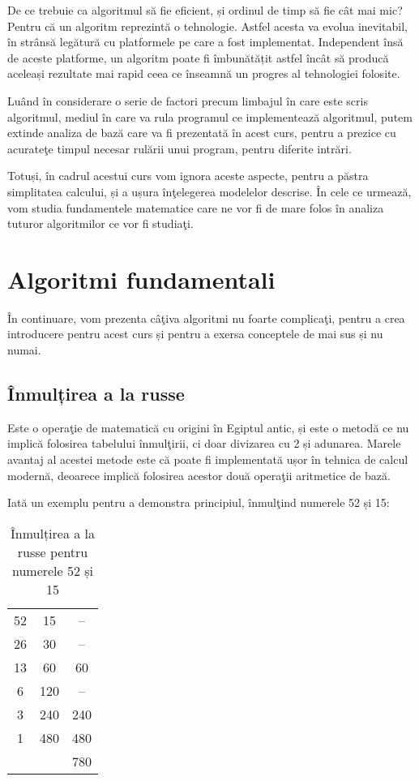 De ce trebuie ca algoritmul să fie eficient, și ordinul de timp să fie cât mai mic? Pentru că un algoritm reprezintă o tehnologie. Astfel acesta va evolua inevitabil, în strânsă legătură cu platformele pe care a fost implementat. Independent însă de aceste platforme, un algoritm poate fi îmbunătățit astfel încât să producă aceleași rezultate mai rapid ceea ce înseamnă un progres al tehnologiei folosite.


Luând în considerare o serie de factori precum limbajul în care este scris algoritmul, mediul în care va rula programul ce implementează algoritmul, putem extinde analiza de bază care va fi prezentată în acest curs, pentru a prezice cu acurateţe timpul necesar rulării unui program, pentru diferite intrări. 

Totuși, în cadrul acestui curs vom ignora aceste aspecte, pentru a păstra simplitatea calcului, și a ușura înţelegerea modelelor descrise. În cele ce urmează, vom studia fundamentele matematice care ne vor fi de mare folos în analiza tuturor algoritmilor ce vor fi studiaţi.

\section{Algoritmi fundamentali}

În continuare, vom prezenta câţiva algoritmi nu foarte complicaţi, pentru a crea
introducere pentru acest curs și pentru a exersa conceptele de mai sus și nu numai.

\subsection{Înmulțirea a la russe}


Este o operaţie de matematică cu origini în Egiptul antic, și este o metodă ce nu implică folosirea tabelului înmulţirii, ci doar divizarea cu 2 și adunarea. Marele avantaj al acestei metode este că poate fi implementată ușor în tehnica de calcul modernă, deoarece implică folosirea acestor două operaţii aritmetice
de bază.

Iată un exemplu pentru a demonstra principiul, înmulţind numerele 52 și 15:

\begin{table}[h]
	\centering
	\begin{tabular}{ c c c }
		52 & 15 & -- \\ 
		26 & 30 & -- \\  
		13 & 60 & 60 \\    
		6 & 120 & -- \\    
		3 & 240 & 240 \\   
		1 & 480 & 480 \\    
		 \hline 
		 &  & 780 \\     
	\end{tabular}
	\caption{Înmulțirea a la russe pentru numerele 52 și 15}
	\label{table:alarusse}
\end{table}


